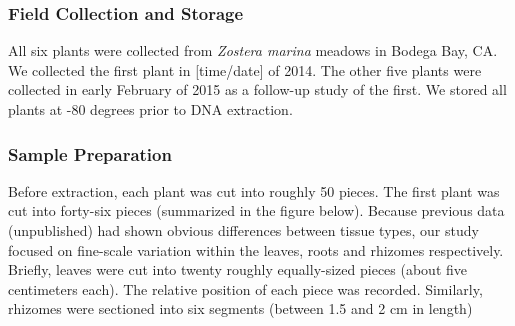 
\subsubsection{Field Collection and Storage}

All six plants were collected from \textit{Zostera marina} meadows in Bodega Bay, CA. We collected the first plant in [time/date] of 2014. The other five plants were collected in early February of 2015 as a follow-up study of the first. We stored all plants at -80 degrees prior to DNA extraction. 

\subsubsection{Sample Preparation}

Before extraction, each plant was cut into roughly 50 pieces. The first plant was cut into forty-six pieces (summarized in the figure below). Because previous data (unpublished) had shown obvious differences between tissue types, our study focused on fine-scale variation within the leaves, roots and rhizomes respectively. Briefly, leaves were cut into twenty roughly equally-sized pieces (about five centimeters each). The relative position of each piece was recorded. Similarly, rhizomes were sectioned into six segments (between 1.5 and 2 cm in length)
    